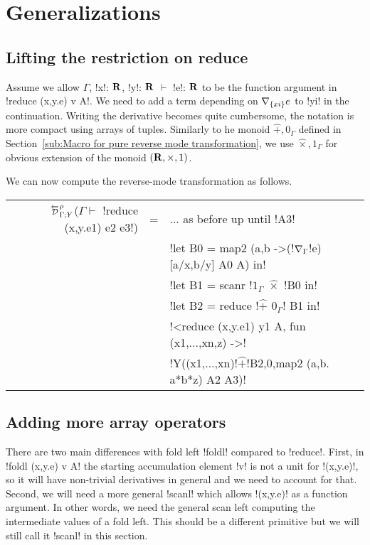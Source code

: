 \section{Generalizations}
\label{sec:generalization}


\subsection{Lifting the restriction on reduce}
\label{sub:Lifting the restriction on reduce}

Assume we allow $\Gamma$, !x!: $\mathbf{R}$, !y!: $\mathbf{R}$ $\vdash$ !e!: $\mathbf{R}$ to be the function argument in
!reduce (x,y.e) v A!. We need to add a term depending on $\nabla_{\{xi\}}e$ to !yi! in the continuation.
Writing the derivative becomes quite cumbersome, the notation is more compact using arrays of tuples. 
Similarly to he monoid $\widehat{+},0_\Gamma$ defined in Section~\ref{sub:Macro for pure reverse mode transformation},
we use $\widehat{\times},1_\Gamma$ for obvious extension of the monoid $(\mathbf{R},\times,1)$.

We can now compute the reverse-mode transformation as follows.
\begin{center}
\begin{tabular}{r c l}
$\directD{\rho}{\Gamma}{Y}$($\Gamma\vdash $ !reduce (x,y.e1) e2 e3!) 
&=& ... as before up until !A3! \\
&& !let B0 = map2 (a,b ->(!$\nabla_\Gamma$!e)[a/x,b/y] A0 A) in!\\
&& !let B1 = scanr !$1_\Gamma$ $\widehat{\times}$ !B0 in! \\
&& !let B2 = reduce !$\widehat{+}$ $0_\Gamma$! B1 in! \\
&& !<reduce (x,y.e1) y1 A, fun (x1,...,xn,z) ->! \\
&& !Y((x1,...,xn)!$\widehat{+}$!B2,0,map2 (a,b. a*b*z) A2 A3)!
\end{tabular}
\end{center}

\subsection{Adding more array operators}
\label{sub:Adding more array operators}

There are two main differences with fold left !foldl! compared to !reduce!. 
First, in !foldl (x,y.e) v A! the starting accumulation element !v! is not a unit for !(x,y.e)!,
so it will have non-trivial derivatives in general and we need to account for that.
Second, we will need a more general !scanl! which allows !(x,y.e)! as a function argument. 
In other words, we need the general scan left computing the intermediate values of a fold left.
This should be a different primitive but we will still call it !scanl! in this section.

